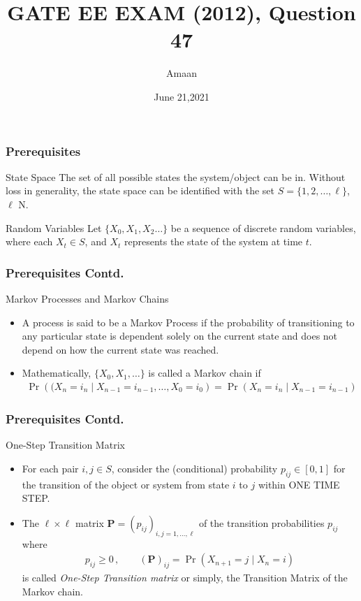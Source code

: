 \documentclass{beamer}
\title{GATE EE EXAM (2012), Question 47}
\author{Amaan}
\date{June 21,2021}
\renewcommand{\vec}[1]{\mathbf{#1}}
\providecommand{\pr}[1]{\ensuremath{\Pr\left(#1\right)}}
\let\vec\mathbf
\begin{document}
\begin{frame}
\titlepage
\end{frame}

\begin{frame}
    \frametitle{Prerequisites}
    \begin{block}{State Space}
      The set of all possible states the system/object can be in. Without loss in generality, the state space can be identified with the set $S=\{ 1,2,\dots,\ell\}$, $\ell$ \in N.
    \end{block}
    \begin{block}{Random Variables}
     Let $\{ X_0,X_1,X_2\dots\}$ be a sequence of discrete random variables, where each $X_t \in S$, and $X_t$ represents the state of the system at time $t$.
    \end{block}
\end{frame}

\begin{frame}
    \frametitle{Prerequisites Contd.}
    \begin{block}{Markov Processes and Markov Chains}
     \begin{itemize}
    \item A process is said to be a Markov Process if the probability of transitioning to any particular state is dependent solely on the current state and does not depend on how the current state was reached.
    \item Mathematically, $ \{X_0,X_1,\ldots\}$ is called a  Markov chain if 
 \begin{align}
    \pr{(X_{n}=i_n\mid X_{n-1}=i_{n-1},\ldots,X_0=i_{0}}= \pr{X_{n}=i_n\mid X_{n-1}=i_{n-1}}
    \label{eq1}
 \end{align}
     \end{itemize}
\end{block}
\end{frame}

\begin{frame}
\frametitle{Prerequisites Contd.}
    \begin{block}{One-Step Transition Matrix}
     \begin{itemize}
        \item  For each pair $ i,j\in S$, consider the (conditional) probability $ p_{ij}\in[0,1]$ for the transition of the object or system from state $ i$ to $ j$ within ONE TIME STEP.
        \item The $ \ell\times\ell$ matrix $ {\vec{P}}=(p_{ij})_{i,j=1,\ldots,\ell}$ of the transition probabilities $ p_{ij}$ where
        \begin{align}
            p_{ij}\ge0\,,\qquad (\vec P)_{ij}=\pr{X_{n+1}=j\mid X_{n}=i}	
            \label{eq2}
        \end{align}
        is called \textit{One-Step Transition matrix} or simply, the Transition Matrix of the Markov chain.
    \end{itemize}
    \end{block}
\end{frame}
\end{document}
